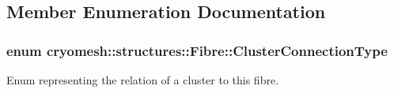 \subsection{\-Member \-Enumeration \-Documentation}
\hypertarget{classcryomesh_1_1structures_1_1Fibre_a1bae341ec1ee07bdc7855b287bee2061}{
\subsubsection[{\-Cluster\-Connection\-Type}]{\setlength{\rightskip}{0pt plus 5cm}enum {\bf cryomesh\-::structures\-::\-Fibre\-::\-Cluster\-Connection\-Type}}}\label{classcryomesh_1_1structures_1_1Fibre_a1bae341ec1ee07bdc7855b287bee2061}


\-Enum representing the relation of a cluster to this fibre. 

